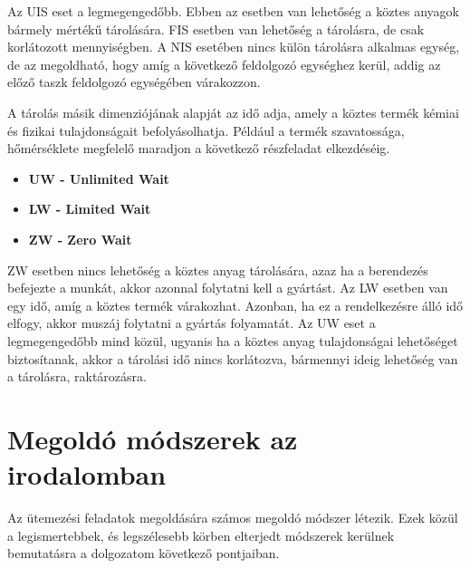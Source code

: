 Az UIS eset a legmegengedőbb.
Ebben az esetben van lehetőség a köztes anyagok bármely mértékű tárolására.
FIS esetben van lehetőség a tárolásra, de csak korlátozott mennyiségben.
A NIS esetében nincs külön tárolásra alkalmas egység, de az megoldható, hogy amíg a következő feldolgozó egységhez kerül, addig az előző taszk feldolgozó egységében várakozzon.	

A tárolás másik dimenziójának alapját az idő adja, amely a köztes termék kémiai és fizikai tulajdonságait befolyásolhatja.
Például a termék szavatossága, hőmérséklete megfelelő maradjon a következő részfeladat elkezdéséig.	
\begin{itemize}
	\item \textbf{UW - Unlimited Wait}
	\item \textbf{LW - Limited Wait}
	\item \textbf{ZW - Zero Wait}	
\end{itemize}

ZW esetben nincs lehetőség a köztes anyag tárolására, azaz ha a berendezés befejezte a munkát, akkor azonnal folytatni kell a gyártást.
Az LW esetben van egy idő, amíg a köztes termék várakozhat.
Azonban, ha ez a rendelkezésre álló idő elfogy, akkor muszáj folytatni a gyártás folyamatát.
Az UW eset a legmegengedőbb mind közül, ugyanis ha a köztes anyag tulajdonságai lehetőséget biztosítanak, akkor a tárolási idő nincs korlátozva, bármennyi ideig lehetőség van a tárolásra, raktározásra.

\section{Megoldó módszerek az irodalomban}
Az ütemezési feladatok megoldására számos megoldó módszer létezik.
Ezek közül a legismertebbek, és legszélesebb körben elterjedt módszerek kerülnek bemutatásra a dolgozatom következő pontjaiban.

